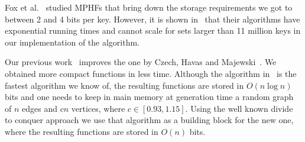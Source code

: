 
Fox et al.~\cite{fch92,fhcd92} studied MPHFs 
that bring down the storage requirements we got to between 2 and 4 bits per key.
However, it is shown in~\cite[Section 6.7]{chm97} that their algorithms have exponential 
running times and cannot scale for sets larger than 11 million keys in our 
implementation of the algorithm.  

Our previous work~\cite{bkz05} improves the one by Czech, Havas and Majewski~\cite{chm92}.
We obtained more compact functions in less time. Although 
the algorithm in~\cite{bkz05} is the fastest algorithm 
we know of, the resulting functions are stored in $O(n\log n)$ bits and
one needs to keep in main memory at generation time a random graph of $n$ edges
and $cn$ vertices, 
where $c\in[0.93,1.15]$.  Using the well known divide to conquer approach
we use that algorithm as a building block for the new one, where the
resulting functions are stored in $O(n)$ bits.
